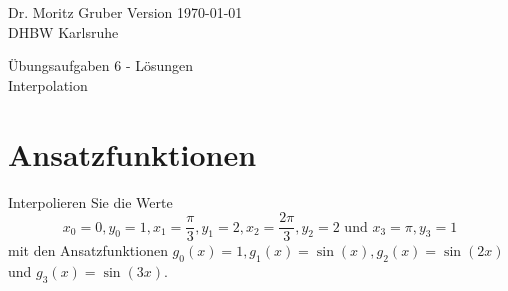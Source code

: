 




\vspace*{-20mm}
{
	\color{dhbwGray}
	Dr. Moritz Gruber	\hfill Version \today\\
	DHBW Karlsruhe\\
}

\vspace{10mm}
\begin{center}
	{
		{ \LARGE 	Übungsaufgaben 6 - Lösungen}\\[3mm]
		{\Large Interpolation}
	}
\end{center}


\section{Ansatzfunktionen}
Interpolieren Sie die Werte
$$
x_0=0, y_0=1, x_1=\frac{\pi}{3}, y_1=2, x_2=\frac{2\pi}{3}, y_2=2 \text{ und }x_3=\pi, y_3=1
$$
mit den Ansatzfunktionen $g_0(x)=1, g_1(x)=\sin(x), g_2(x)=\sin(2x)$ und $g_3(x)=\sin(3x)$.

